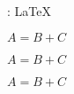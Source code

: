 \documentclass[10pt, a4paper]{../main/main}
\begin{document}
\tdocinlatex{\LaTeX} : \LaTeX


\begin{tdoclatex}
	$A = B + C$
\end{tdoclatex}

\begin{tdoclatex}[sbs]
	$A = B + C$
\end{tdoclatex}

\begin{tdoclatex}[code]
	$A = B + C$
\end{tdoclatex}
\end{document}
